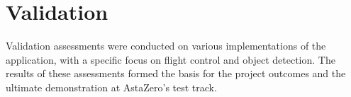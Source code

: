 

\section{Validation}
\label{sec:val}
Validation assessments were conducted on various implementations of the application, with a specific focus on flight control and object detection. The results of these assessments formed the basis for the project outcomes and the ultimate demonstration at AstaZero's test track.

